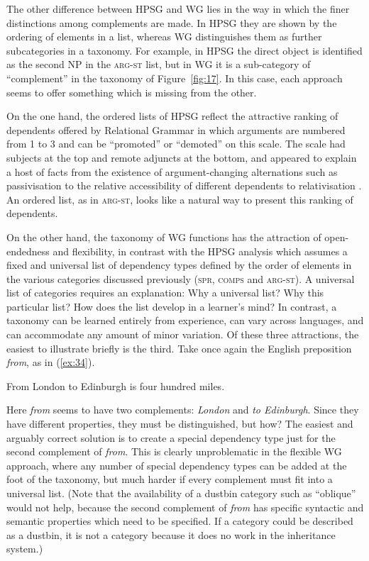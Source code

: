 \documentclass[output=paper
	        ,collection
	        ,collectionchapter
 	        ,biblatex
                ,babelshorthands
                ,newtxmath
                ,draftmode
                ,colorlinks, citecolor=brown
]{langscibook}
\begin{document}
The other difference between HPSG and WG lies in the way in which the finer distinctions among complements are made. In HPSG they are shown by the ordering of elements in a list, whereas WG distinguishes them as further subcategories in a taxonomy. For example, in HPSG the direct object is identified as the second NP in the \textsc{arg-st} list, but in WG it is a sub-category of ``complement'' in the taxonomy of Figure~\ref{fig:17}. In this case, each approach seems to offer something which is missing from the other.

On the one hand, the ordered lists of HPSG reflect the attractive ranking of dependents offered by Relational Grammar \citep{PP83a-u,Blake1990} in which arguments are numbered from 1 to 3 and can be ``promoted'' or ``demoted'' on this scale. The scale had subjects at the top and remote adjuncts at the bottom, and appeared to explain a host of facts from the existence of argument-changing alternations such as passivisation \citep{Levin93a-u} to the relative accessibility of different dependents to relativisation \citep{KC77a}. An ordered list, as in \textsc{arg-st}, looks like a natural way to present this ranking of dependents.

On the other hand, the taxonomy of WG functions has the attraction of open-endedness and flexibility, in contrast with the HPSG analysis which assumes a fixed and universal list of dependency types defined by the order of elements in the various categories discussed previously (\textsc{spr}, \textsc{comps} and \textsc{arg-st}). A universal list of categories requires an explanation: Why a universal list? Why this particular list? How does the list develop in a learner’s mind? In contrast, a taxonomy can be learned entirely from experience, can vary across languages, and can accommodate any amount of minor variation. Of these three attractions, the easiest to illustrate briefly is the third. Take once again the English preposition \emph{from}, as in (\ref{ex:34}).

\begin{exe}
	\ex \label{ex:34} From London to Edinburgh is four hundred miles.
\end{exe}

Here \emph{from} seems to have two complements: \emph{London} and \emph{to Edinburgh}. Since they have different properties, they must be distinguished, but how? The easiest and arguably correct solution is to create a special dependency type just for the second complement of \emph{from}. This is clearly unproblematic in the flexible WG approach, where any number of special dependency types can be added at the foot of the taxonomy, but much harder if every complement must fit into a universal list. (Note that the availability of a dustbin category such as ``oblique'' would not help, because the second complement of \emph{from} has specific syntactic and semantic properties which need to be specified. If a category could be described as a dustbin, it is not a category because it does no work in the inheritance system.)
\end{document}
